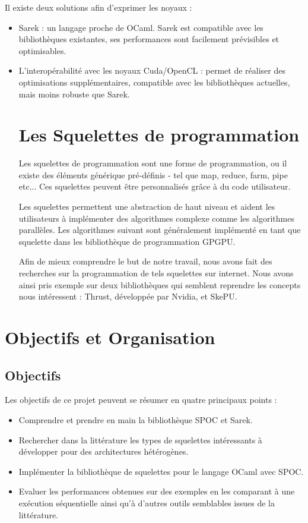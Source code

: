 \documentclass{report}
\begin{document}
Il existe deux solutions afin d’exprimer les noyaux :
\begin{itemize}
  
\item Sarek : un langage proche de OCaml. Sarek est compatible avec les bibliothèques existantes, ses performances sont facilement prévisibles et optimisables.
  
\item L’interopérabilité avec les noyaux Cuda/OpenCL : permet de réaliser des optimisations supplémentaires, compatible avec les bibliothèques actuelles, mais moins robuste que Sarek.

\section{Les Squelettes de programmation}
Les squelettes de programmation\cite{refSkeleton} sont une forme de programmation, ou il existe des éléments générique pré-définis - tel que map, reduce, farm, pipe etc... Ces squelettes peuvent être personnalisés grâce à du code utilisateur.\newline

Les squelettes permettent une abstraction de haut niveau et aident les utilisateurs à implémenter des algorithmes complexe comme les algorithmes parallèles. Les algorithmes suivant sont généralement implémenté en tant que squelette dans les bibliothèque de programmation GPGPU.\newline

Afin de mieux comprendre le but de notre travail, nous avons fait des recherches sur la programmation de tels squelettes sur internet. Nous avons ainsi pris exemple sur deux bibliothèques qui semblent reprendre les concepts nous intéressent : Thrust, développée par Nvidia, et SkePU.\newline

\end{itemize}

\section{Objectifs et Organisation}
\subsection{Objectifs}
Les objectifs de ce projet peuvent se résumer en quatre principaux points :
\begin{itemize}
\item Comprendre et prendre en main la bibliothèque SPOC et Sarek.
\item Rechercher dans la littérature les types de squelettes intéressants à développer  pour des architectures hétérogènes.
\item Implémenter la bibliothèque de squelettes pour le langage OCaml avec SPOC.
\item Evaluer les performances obtenues sur des exemples en les comparant à une exécution séquentielle ainsi qu'à d'autres outils semblables issues de la littérature. 
\end{itemize}
\end{document}
